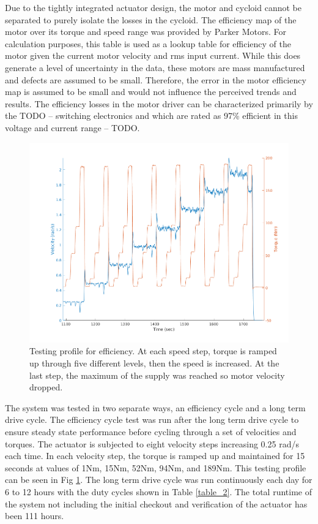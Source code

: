 Due to the tightly integrated actuator design, the motor and cycloid cannot be separated to purely isolate the losses in the cycloid. The efficiency map of the motor over its torque and speed range was provided by Parker Motors. For calculation purposes, this table is used as a lookup table for efficiency of the motor given the current motor velocity and rms input current. While this does generate a level of uncertainty in the data, these motors are mass manufactured and defects are assumed to be small. Therefore, the error in the motor efficiency map is assumed to be small and would not influence the perceived trends and results. The efficiency losses in the motor driver can be characterized primarily by the TODO -- switching electronics and which are rated as 97\% efficient in this voltage and current range -- TODO. 

   \begin{figure}[!b]
      \centering
      \includegraphics[width=\linewidth]{eff_test_profile_v3}
      \caption{Testing profile for efficiency. At each speed step, torque is ramped up through five different levels, then the speed is increased. At the last step, the maximum of the supply was reached so motor velocity dropped.}
      \label{eff_profile}
   \end{figure}
   
The system was tested in two separate ways, an efficiency cycle and a long term drive cycle. The efficiency cycle test was run after the long term drive cycle to ensure steady state performance before cycling through a set of velocities and torques. The actuator is subjected to eight velocity steps increasing 0.25 rad/s each time. In each velocity step, the torque is ramped up and maintained for 15 seconds at values of 1Nm, 15Nm, 52Nm, 94Nm, and 189Nm. This testing profile can be seen in Fig \ref{eff_profile}. The long term drive cycle was run continuously each day for 6 to 12 hours with the duty cycles shown in Table \ref{table_2}. The total runtime of the system not including the initial checkout and verification of the actuator has been 111 hours. 


